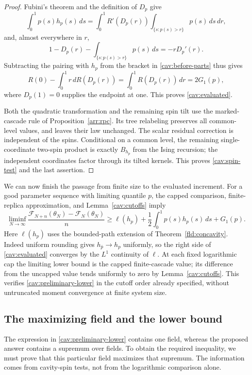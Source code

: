 \begin{proof}
Fubini's theorem and the definition of $D_p$ give
\[
 \int_0^1p(s)h_p(s)\,ds
 =\int_0^1R'(D_p(r))\int_{\{s:p(s)>r\}}p(s)\,ds\,dr,
\]
and, almost everywhere in $r$,
\[
 1-D_p(r)-\int_{\{s:p(s)>r\}}p(s)\,ds=-rD_p'(r).
\]
Subtracting the pairing with $h_p$ from the bracket in
\eqref{cav:before-parts} thus gives
\[
 R(0)-\int_0^1r\,dR(D_p(r))
 =\int_0^1R(D_p(r))\,dr=2G_1(p),
\]
where $D_p(1)=0$ supplies the endpoint at one.  This proves
\eqref{cav:evaluated}.

Both the quadratic transformation and the remaining spin tilt use
the marked-cascade rule of Proposition~\ref{arr:rpc}.  Its tree
relabeling preserves all common-level values, and leaves their law
unchanged.  The scalar residual correction is independent of the
spins.  Conditional on a common level, the remaining single-coordinate
two-spin product is exactly $B_{h_p}$ from the Ising recursion; the
independent coordinates factor through its tilted kernels.  This
proves \eqref{cav:spin-test} and the last assertion.
\end{proof}

We can now finish the passage from finite size to the evaluated
increment.  For a good parameter sequence with limiting quantile $p$,
the capped comparison, finite-replica approximation, and
Lemma~\ref{cav:cutoffs} imply
\begin{equation}\label{cav:preliminary-lower}
 \liminf_{N\to\infty}
 \frac{\mathcal F_{N+n}(\theta_N)-\mathcal F_N(\theta_N)}{n}
 \ge\ell(h_p)+\frac12\int_0^1p(s)h_p(s)\,ds+G_1(p).
\end{equation}
Here $\ell(h_p)$ uses the bounded-path extension of
Theorem~\ref{fld:concavity}.  Indeed uniform rounding gives
$h_{\bar p}\to h_p$ uniformly, so the right side of
\eqref{cav:evaluated} converges by the $L^1$ continuity of $\ell$.
At each fixed logarithmic cap the limiting lower bound is the capped
finite-cascade value; its difference from the uncapped value tends
uniformly to zero by Lemma~\ref{cav:cutoffs}.  This verifies
\eqref{cav:preliminary-lower} in the cutoff order already specified,
without untruncated moment convergence at finite system size.

\subsection{The maximizing field and the lower bound}

The expression in \eqref{cav:preliminary-lower} contains one field,
whereas the proposed answer contains a supremum over fields.  To obtain
the required inequality, we must prove that this particular field
maximizes that supremum.  The information comes from cavity-spin tests,
not from the logarithmic comparison alone.

